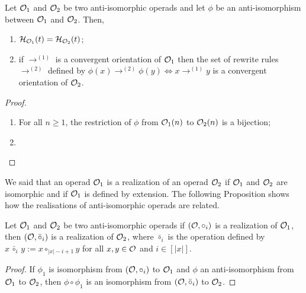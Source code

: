 \begin{Proposition} \label{prop:recall_anti_isomorphic}
  Let $\mathcal{O}_1$ and $\mathcal{O}_2$ be two anti-isomorphic operads and let
  $\phi$ be an anti-isomorphism between $\mathcal{O}_1$ and $\mathcal{O}_2$. Then,
    \begin{enumerate}[label={(\it\roman*)}]
        \item $\mathcal{H}_{\mathcal{O}_1}(t) = \mathcal{H}_{\mathcal{O}_2}(t)$;
        \item if $\rightarrow^{(1)}$ is a convergent orientation of 
        $\mathcal{O}_1$
        then the set of rewrite rules $\rightarrow^{(2)}$ defined by
        \begin{math}
          \phi(x) \rightarrow^{(2)} \phi(y) \iff x \rightarrow^{(1)} y
        \end{math}
        is a convergent orientation of $\mathcal{O}_2$.
    \end{enumerate}
\end{Proposition}
\begin{proof}
  \begin{enumerate}[label={(\it\roman*)}]
    \item For all $n \geq 1$, the restriction of $\phi$ from 
    $\mathcal{O}_1(n)$ to $\mathcal{O}_2(n)$ is a bijection;
    \item {} 
  \end{enumerate} 
\end{proof}
\medbreak

We said that an operad $\mathcal{O}_1$ is a realization of an operad $\mathcal{O}_2$ 
if $\mathcal{O}_1$ and $\mathcal{O}_2$ are isomorphic and if $\mathcal{O}_1$ is defined 
by extension.
 The following Proposition shows how the realisations of 
anti-isomorphic operads are related.

\begin{Proposition} \label{prop:realization_anti_isomorphic}
  Let $\mathcal{O}_1$ and $\mathcal{O}_2$ be two anti-isomorphic operads
  if $\left(\mathcal{O}, \circ_i\right)$ is a realization of $\mathcal{O}_1$, 
  then
  \begin{math}
    \left(\mathcal{O}, \bar{\circ}_i\right)
  \end{math}
  is a realization of $\mathcal{O}_2$, where $\bar{\circ}_i$ is the
  operation defined by
  \begin{math}
    x \, \bar{\circ}_i \, y := x \circ_{|x| - i + 1} y
  \end{math}
  for all $x, y \in \mathcal{O}$ and $i \in [|x|]$.
\end{Proposition}

\begin{proof}
  If $\phi_1$ is isomorphism from $(\mathcal{O}, \circ_i)$ to 
  $\mathcal{O}_1$ and $\phi$ an anti-isomorphism from $\mathcal{O}_1$ to $\mathcal{O}_2$, 
  then $\phi \circ \phi_1$ is an isomorphism from
  $(\mathcal{O}, \bar{\circ}_i)$ to $\mathcal{O}_2$. 
\end{proof}
%
%

